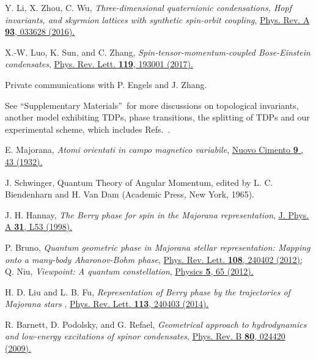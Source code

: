 \documentclass[aps,prl,floatfix,twocolumn,reprint]{revtex4}
\begin{document}
\begin{thebibliography}{99}
 Y. Li, X. Zhou, C. Wu, \textit{Three-dimensional
quaternionic condensations, Hopf invariants, and skyrmion lattices with
synthetic spin-orbit coupling}, \href{https://doi.org/10.1103/PhysRevA.93.033628}%
{Phys. Rev. A \textbf{93}, 033628 (2016).}

 X.-W. Luo, K. Sun, and C. Zhang, \textit{%
Spin-tensor-momentum-coupled Bose-Einstein condensates}, \href{https://doi.org/10.1103/PhysRevLett.119.193001}%
{Phys. Rev. Lett. {\textbf{119}}, 193001 (2017).}

 Private communications with P. Engels and J. Zhang.

 See \textquotedblleft Supplementary
Materials\textquotedblright\ for more discussions on topological invariants, another model
exhibiting TDPs, phase transitions, the splitting of
TDPs and our experimental scheme, which includes Refs.~\cite{majorana1,schwinger,majorana2,majorana3,majorana4,majorana5,book}.

 E. Majorana, \textit{Atomi orientati in campo magnetico
variabile}, \href{https://doi.org/10.1007/BF02960953}{Nuovo Cimento \textbf{9%
}, 43 (1932).}

 J. Schwinger, Quantum Theory of Angular Momentum, edited
by L. C. Biendenharn and H. Van Dam (Academic Press, New York, 1965).

 J. H. Hannay, \textit{The Berry phase for spin in the
Majorana representation}, \href{https://doi.org/10.1088/0305-4470/31/2/002}{%
J. Phys. A \textbf{31}, L53 (1998).}

 P. Bruno, \textit{Quantum geometric phase in Majorana stellar representation: Mapping onto a many-body
Aharonov-Bohm phase}, \href{https://doi.org/10.1103/PhysRevLett.108.240402}{%
Phys. Rev. Lett. \textbf{108}, 240402 (2012);} Q. Niu, \textit{Viewpoint: A
quantum constellation}, \href{https://physics.aps.org/articles/v5/65}{%
Physics \textbf{5}, 65 (2012).}

 H. D. Liu and L. B. Fu,
\textit{Representation of Berry phase by the trajectories of Majorana stars}%
, \href{https://doi.org/10.1103/PhysRevLett.113.240403}{Phys. Rev. Lett.
\textbf{113}, 240403 (2014).}

 R. Barnett, D. Podolsky, and G. Refael, \textit{%
Geometrical approach to hydrodynamics and low-energy excitations of spinor
condensates}, \href{https://doi.org/10.1103/PhysRevB.80.024420}{Phys. Rev. B
\textbf{80}, 024420 (2009).}


\end{thebibliography}
\end{document}
